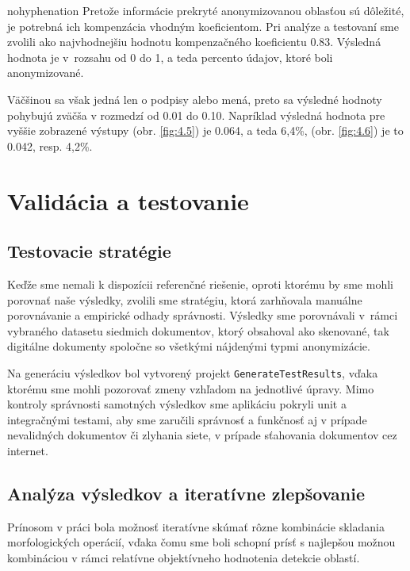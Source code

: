 \begin{hyphenrules}{nohyphenation}
Pretože informácie prekryté anonymizovanou oblasťou sú dôležité, je potrebná ich kompenzácia 
vhodným koeficientom. Pri analýze a testovaní sme zvolili ako najvhodnejšiu hodnotu kompenzačného 
koeficientu 0.83. Výsledná hodnota je v~rozsahu od 0 do 1, a teda percento údajov, ktoré boli 
anonymizované.
\newline

Väčšinou sa však jedná len o podpisy alebo mená, preto sa výsledné hodnoty pohybujú zväčša v rozmedzí od 0.01 do 0.10. Napríklad výsledná hodnota pre vyššie zobrazené výstupy (obr. \ref{fig:4.5}) je 0.064, a teda 6,4\%, (obr. \ref{fig:4.6}) je to 0.042, resp. 4,2\%.
\section{Validácia a testovanie}
\subsection{Testovacie stratégie}
Keďže sme nemali k dispozícii referenčné riešenie, oproti ktorému by sme mohli porovnať naše výsledky, zvolili sme stratégiu, ktorá zarhňovala manuálne porovnávanie a empirické odhady správnosti. Výsledky sme porovnávali v~rámci vybraného datasetu siedmich dokumentov, ktorý obsahoval ako skenované, tak digitálne dokumenty spoločne so všetkými nájdenými typmi anonymizácie.
\newline 

Na generáciu výsledkov bol vytvorený projekt \texttt{GenerateTestResults}, vďaka ktorému sme mohli pozorovať zmeny vzhľadom na jednotlivé úpravy. Mimo kontroly správnosti samotných výsledkov sme aplikáciu pokryli unit a integračnými testami, aby sme zaručili správnosť a funkčnosť aj v prípade nevalidných dokumentov či zlyhania siete, v prípade sťahovania dokumentov cez internet.

\subsection{Analýza výsledkov a iteratívne zlepšovanie}
Prínosom v práci bola možnosť iteratívne skúmať rôzne kombinácie skladania morfologických operácií, vďaka čomu sme boli schopní prísť s najlepšou možnou kombináciou v rámci relatívne objektívneho hodnotenia detekcie oblastí.
\end{hyphenrules}